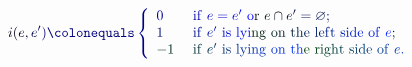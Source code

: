 \documentclass[12pt]{article}
\begin{document}
\makeatletter
\renewcommand*{\@textcolor}[3]{%
  \protect\leavevmode
  \begingroup
    \color#1{#2}#3%
  \endgroup
}
\makeatother
\begin{displaymath}
\mathcolor[RGB]{0,0,15}{i} \mathcolor[RGB]{0,0,30}{(} \mathcolor[RGB]{0,0,45}{e} \mathcolor[RGB]{0,0,60}{,} \mathcolor[RGB]{0,0,75}{e} ^ { \mathcolor[RGB]{0,0,90}{\prime} } \mathcolor[RGB]{0,0,105}{)} \mathcolor[RGB]{0,0,120}{\colonequals} \mathcolor[RGB]{0,0,135}{\left\{} \begin{array} {ll} { \mathcolor[RGB]{0,0,150}{0} } & { \mathrm { ~ \mathcolor[RGB]{0,0,165}{i} \mathcolor[RGB]{0,0,180}{f} ~ } \mathcolor[RGB]{0,0,195}{e} \mathcolor[RGB]{0,0,210}{=} \mathcolor[RGB]{0,0,225}{e} ^ { \mathcolor[RGB]{0,0,240}{\prime} } \mathrm { ~ \mathcolor[RGB]{0,0,255}{o} \mathcolor[RGB]{0,15,0}{r} ~ } \mathcolor[RGB]{0,15,15}{e} \mathcolor[RGB]{0,15,30}{\cap} \mathcolor[RGB]{0,15,45}{e} ^ { \mathcolor[RGB]{0,15,60}{\prime} } \mathcolor[RGB]{0,15,75}{=} \mathcolor[RGB]{0,15,90}{\varnothing} \mathcolor[RGB]{0,15,105}{;} } \\ { \mathcolor[RGB]{0,15,120}{1} } & { \mathrm { ~ \mathcolor[RGB]{0,15,135}{i} \mathcolor[RGB]{0,15,150}{f} ~ } \mathcolor[RGB]{0,15,165}{e} ^ { \mathcolor[RGB]{0,15,180}{\prime} } \mathrm { ~ \mathcolor[RGB]{0,15,195}{i} \mathcolor[RGB]{0,15,210}{s} ~ \mathcolor[RGB]{0,15,225}{l} \mathcolor[RGB]{0,15,240}{y} \mathcolor[RGB]{0,15,255}{i} \mathcolor[RGB]{0,30,0}{n} \mathcolor[RGB]{0,30,15}{g} ~ \mathcolor[RGB]{0,30,30}{o} \mathcolor[RGB]{0,30,45}{n} ~ \mathcolor[RGB]{0,30,60}{t} \mathcolor[RGB]{0,30,75}{h} \mathcolor[RGB]{0,30,90}{e} ~ \mathcolor[RGB]{0,30,105}{l} \mathcolor[RGB]{0,30,120}{e} \mathcolor[RGB]{0,30,135}{f} \mathcolor[RGB]{0,30,150}{t} ~ \mathcolor[RGB]{0,30,165}{s} \mathcolor[RGB]{0,30,180}{i} \mathcolor[RGB]{0,30,195}{d} \mathcolor[RGB]{0,30,210}{e} ~ \mathcolor[RGB]{0,30,225}{o} \mathcolor[RGB]{0,30,240}{f} ~ } \mathcolor[RGB]{0,30,255}{e} \mathcolor[RGB]{0,45,0}{;} } \\ { \mathcolor[RGB]{0,45,15}{-} \mathcolor[RGB]{0,45,30}{1} } & { \mathrm { ~ \mathcolor[RGB]{0,45,45}{i} \mathcolor[RGB]{0,45,60}{f} ~ } \mathcolor[RGB]{0,45,75}{e} ^ { \mathcolor[RGB]{0,45,90}{\prime} } \mathrm { ~ \mathcolor[RGB]{0,45,105}{i} \mathcolor[RGB]{0,45,120}{s} ~ \mathcolor[RGB]{0,45,135}{l} \mathcolor[RGB]{0,45,150}{y} \mathcolor[RGB]{0,45,165}{i} \mathcolor[RGB]{0,45,180}{n} \mathcolor[RGB]{0,45,195}{g} ~ \mathcolor[RGB]{0,45,210}{o} \mathcolor[RGB]{0,45,225}{n} ~ \mathcolor[RGB]{0,45,240}{t} \mathcolor[RGB]{0,45,255}{h} \mathcolor[RGB]{0,60,0}{e} ~ \mathcolor[RGB]{0,60,15}{r} \mathcolor[RGB]{0,60,30}{i} \mathcolor[RGB]{0,60,45}{g} \mathcolor[RGB]{0,60,60}{h} \mathcolor[RGB]{0,60,75}{t} ~ \mathcolor[RGB]{0,60,90}{s} \mathcolor[RGB]{0,60,105}{i} \mathcolor[RGB]{0,60,120}{d} \mathcolor[RGB]{0,60,135}{e} ~ \mathcolor[RGB]{0,60,150}{o} \mathcolor[RGB]{0,60,165}{f} ~ } \mathcolor[RGB]{0,60,180}{e} \mathcolor[RGB]{0,60,195}{.} } \end{array} \mathcolor[RGB]{0,60,210}{\right.}
\end{displaymath}
\end{document}
